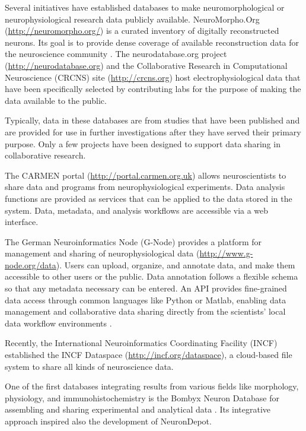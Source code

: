 \documentclass{frontiersSCNS} %
\begin{document}
Several initiatives have established databases to make neuromorphological or
neurophysiological research data publicly available.  NeuroMorpho.Org
(\url{http://neuromorpho.org/}) is a curated inventory of digitally
reconstructed neurons. Its goal is to provide dense coverage of available
reconstruction data for the neuroscience community \citep{Ascoli2007}.  The
neurodatabase.org project (\url{http://neurodatabase.org}) and the
Collaborative Research in Computational Neuroscience (CRCNS) site
(\url{http://crcns.org}) host electrophysiological data that have been
specifically selected by contributing labs for the purpose of making the data
available to the public.

Typically, data in these databases are from studies that have been published
and are provided for use in further investigations after they have served their
primary purpose.  Only a few projects have been designed to support data
sharing in collaborative research.

The CARMEN portal (\url{http://portal.carmen.org.uk}) allows neuroscientists to
share data and programs from neurophysiological experiments.  Data analysis
functions are provided as services that can be applied to the data stored in
the system.  Data, metadata, and analysis workflows are accessible via a web
interface.

The German Neuroinformatics Node (G-Node) provides a platform for management
and sharing of neurophysiological data (\url{http://www.g-node.org/data}).
Users can upload, organize, and annotate data, and make them accessible to
other users or the public.  Data annotation follows a flexible schema \citep{Grewe2011} so that any metadata necessary can be entered.  An API provides
fine-grained data access through common languages like Python or Matlab,
enabling data management and collaborative data sharing directly from the
scientists' local data workflow environments \citep[][under
review]{Sobolev2014}.

Recently, the International Neuroinformatics Coordinating Facility (INCF)
established the INCF Dataspace (\url{http://incf.org/dataspace}), a cloud-based
file system to share all kinds of neuroscience data.

One of the first databases integrating results from various fields like
morphology, physiology, and immunohistochemistry is the Bombyx Neuron Database
for assembling and sharing experimental and analytical data \citep{Kazawa2008}.
Its integrative approach inspired also the development of NeuronDepot.
\end{document}
